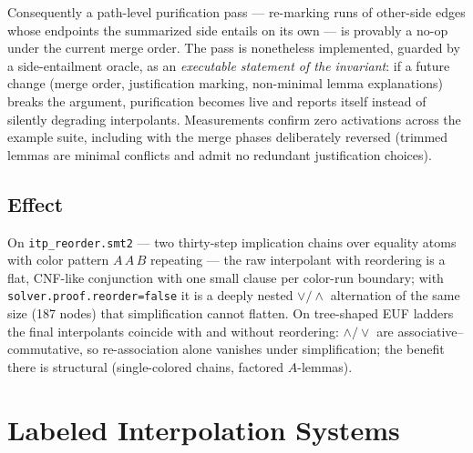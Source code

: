 \documentclass[11pt]{article}
\newcommand{\opt}[1]{\texttt{#1}}
\newcommand{\code}[1]{\texttt{#1}}
\begin{document}
Consequently a path-level purification pass --- re-marking runs of
other-side edges whose endpoints the summarized side entails on its own ---
is provably a no-op under the current merge order. The pass is nonetheless
implemented, guarded by a side-entailment oracle, as an \emph{executable
statement of the invariant}: if a future change (merge order, justification
marking, non-minimal lemma explanations) breaks the argument, purification
becomes live and reports itself instead of silently degrading interpolants.
Measurements confirm zero activations across the example suite, including
with the merge phases deliberately reversed (trimmed lemmas are minimal
conflicts and admit no redundant justification choices).

\subsection{Effect}

On \code{itp\_reorder.smt2} --- two thirty-step implication chains over
equality atoms with color pattern $A\,A\,B$ repeating --- the raw
interpolant with reordering is a flat, CNF-like conjunction with one small
clause per color-run boundary; with \opt{solver.proof.reorder=false} it is a
deeply nested $\vee/\wedge$ alternation of the same size (187 nodes) that
simplification cannot flatten. On tree-shaped EUF ladders the final
interpolants coincide with and without reordering: $\wedge/\vee$ are
associative--commutative, so re-association alone vanishes under
simplification; the benefit there is structural (single-colored chains,
factored $A$-lemmas).

\section{Labeled Interpolation Systems}
\label{sec:labelings}
\end{document}
